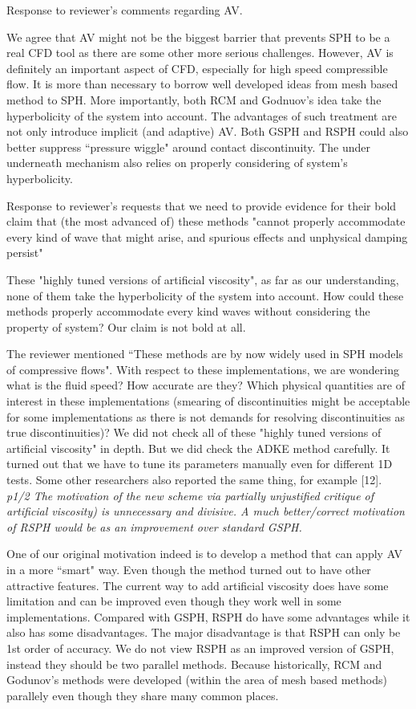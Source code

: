 \documentclass[10pt,a4paper]{article}
\begin{document}
Response to reviewer's comments regarding AV.

We agree that AV might not be the biggest barrier that prevents SPH to be a real CFD tool as there are some other more serious challenges. However, AV is definitely an important aspect of CFD, especially for high speed compressible flow. It is more than necessary to borrow well developed ideas from mesh based method to SPH.
More importantly, both RCM and Godnuov's idea take the hyperbolicity of the system into account. The advantages of such treatment are not only introduce implicit (and adaptive) AV. Both GSPH and RSPH could also better suppress ``pressure wiggle" around contact discontinuity. The under underneath mechanism also relies on properly considering of system's hyperbolicity.

Response to reviewer's requests that we need to provide evidence for their bold claim that (the most advanced of) these methods "cannot properly accommodate every kind of wave that might arise, and spurious effects and unphysical damping persist"

These "highly tuned versions of artificial viscosity", as far as our understanding, none of them take the hyperbolicity of the system into account. How could these methods properly accommodate every kind waves without considering the property of system? Our claim is not bold at all.

The reviewer mentioned ``These methods are by now widely used in SPH models of compressive flows". With respect to these implementations, we are wondering what is the fluid speed? How accurate are they? Which physical quantities are of interest in these implementations (smearing of discontinuities might be acceptable for some implementations as there is not demands for resolving discontinuities as true discontinuities)?
We did not check all of these "highly tuned versions of artificial viscosity" in depth. But we did check the ADKE method carefully. It turned out that we have to tune its parameters manually even for different 1D tests. Some other researchers also reported the same thing, for example [12]. 
\\[3pt]
 
\textit{p1/2 The motivation of the new scheme via partially unjustified critique of artificial viscosity) is unnecessary and divisive. A much
better/correct motivation of RSPH would be as an improvement over standard GSPH.}

One of our original motivation indeed is to develop a method that can apply AV in a more ``smart" way. Even though the method turned out to have other attractive features.
The current way to add artificial viscosity does have some limitation and can be improved even though they work well in some implementations.
Compared with GSPH, RSPH do have some advantages while it also has some disadvantages. The major disadvantage is that RSPH can only be 1st order of accuracy.
We do not view RSPH as an improved version of GSPH, instead they should be two parallel methods. Because historically, RCM and Godunov's methods were developed (within the area of mesh based methods) parallely even though they share many common places.
\\[3pt]
\end{document}
